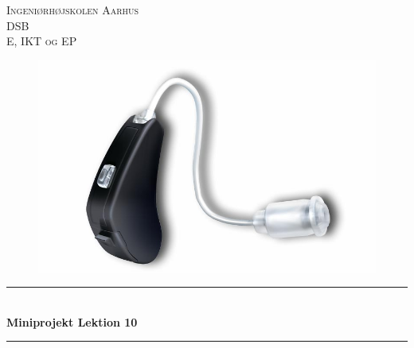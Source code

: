\begin{titlepage}
		
		\newcommand{\HRule}{\rule{\linewidth}{0.5mm}} %
		
		\center %
		
		
		\textsc{\LARGE Ingeniørhøjskolen Aarhus}\\[1cm] %
		\textsc{\Large DSB}\\[0.5cm] %
		\textsc{\large E, IKT og EP}\\[0.5cm] %
		
		\begin{figure}[ht!]
			\centering
			\includegraphics[width=120mm]{figures/forside.jpg}
		\end{figure}

		
		
		\HRule \\[0.5cm]
		{ \huge \bfseries Miniprojekt Lektion 10}\\[0.4cm] %
		\HRule \\[0.5cm]
		
		

\end{titlepage}
